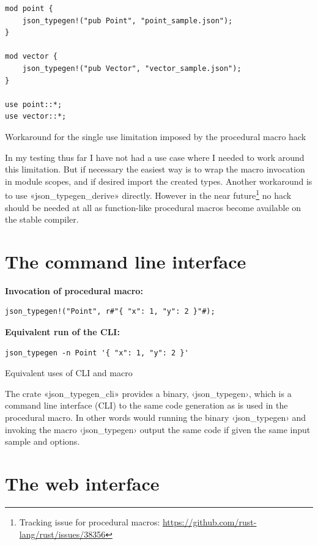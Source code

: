 \begin{listing}[ht!]
\begin{verbatim}
mod point {
    json_typegen!("pub Point", "point_sample.json");
}

mod vector {
    json_typegen!("pub Vector", "vector_sample.json");
}

use point::*;
use vector::*;
\end{verbatim}
\caption{Workaround for the single use limitation imposed by the procedural macro hack}
\label{lst:hack-workaround}
\end{listing}

In my testing thus far I have not had a use case where I needed to work around this limitation. But if necessary the easiest way is to wrap the macro invocation in module scopes, and if desired import the created types. Another workaround is to use «json_typegen_derive» directly. However in the near future\footnote{Tracking issue for procedural macros: \url{https://github.com/rust-lang/rust/issues/38356}} no hack should be needed at all as function-like procedural macros become available on the stable compiler.

\section{The command line interface}

\begin{listing}[ht!]
\textbf{Invocation of procedural macro:}
\begin{verbatim}
json_typegen!("Point", r#"{ "x": 1, "y": 2 }"#);
\end{verbatim}
\vspace{5mm}

\textbf{Equivalent run of the CLI:}
\begin{verbatim}
json_typegen -n Point '{ "x": 1, "y": 2 }'
\end{verbatim}
\caption{Equivalent uses of CLI and macro}
\label{lst:cli-and-macro}
\end{listing}

The crate «json_typegen_cli» provides a binary, ‹json_typegen›, which is a command line interface (CLI) to the same code generation as is used in the procedural macro. In other words would running the binary ‹json_typegen› and invoking the macro ‹json_typegen› output the same code if given the same input sample and options.


\section{The web interface}

